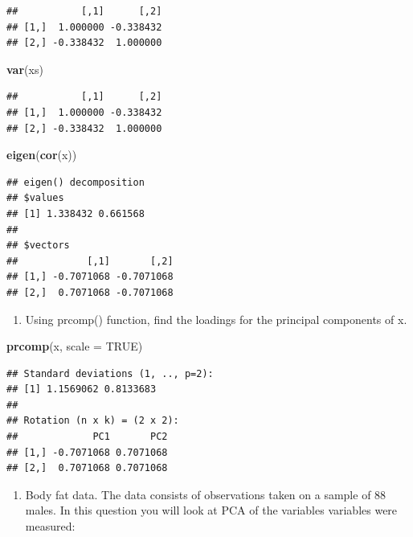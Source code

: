 \documentclass[]{article}
\newenvironment{Shaded}{\begin{snugshade}}{\end{snugshade}}
\newcommand{\DataTypeTok}[1]{\textcolor[rgb]{0.13,0.29,0.53}{#1}}
\newcommand{\KeywordTok}[1]{\textcolor[rgb]{0.13,0.29,0.53}{\textbf{#1}}}
\newcommand{\NormalTok}[1]{#1}
\newcommand{\OtherTok}[1]{\textcolor[rgb]{0.56,0.35,0.01}{#1}}
\providecommand{\tightlist}{%
  \setlength{\itemsep}{0pt}\setlength{\parskip}{0pt}}
\begin{document}
\begin{verbatim}
##           [,1]      [,2]
## [1,]  1.000000 -0.338432
## [2,] -0.338432  1.000000
\end{verbatim}

\begin{Shaded}
\begin{Highlighting}[]
\KeywordTok{var}\NormalTok{(xs)}
\end{Highlighting}
\end{Shaded}

\begin{verbatim}
##           [,1]      [,2]
## [1,]  1.000000 -0.338432
## [2,] -0.338432  1.000000
\end{verbatim}

\begin{Shaded}
\begin{Highlighting}[]
\KeywordTok{eigen}\NormalTok{(}\KeywordTok{cor}\NormalTok{(x))}
\end{Highlighting}
\end{Shaded}

\begin{verbatim}
## eigen() decomposition
## $values
## [1] 1.338432 0.661568
## 
## $vectors
##            [,1]       [,2]
## [1,] -0.7071068 -0.7071068
## [2,]  0.7071068 -0.7071068
\end{verbatim}

\begin{enumerate}
\def\labelenumi{(\alph{enumi})}
\setcounter{enumi}{4}
\tightlist
\item
  Using prcomp() function, find the loadings for the principal
  components of x.
\end{enumerate}

\begin{Shaded}
\begin{Highlighting}[]
\KeywordTok{prcomp}\NormalTok{(x, }\DataTypeTok{scale =} \OtherTok{TRUE}\NormalTok{)}
\end{Highlighting}
\end{Shaded}

\begin{verbatim}
## Standard deviations (1, .., p=2):
## [1] 1.1569062 0.8133683
## 
## Rotation (n x k) = (2 x 2):
##             PC1       PC2
## [1,] -0.7071068 0.7071068
## [2,]  0.7071068 0.7071068
\end{verbatim}

\begin{enumerate}
\def\labelenumi{\arabic{enumi}.}
\setcounter{enumi}{1}
\tightlist
\item
  Body fat data. The data consists of observations taken on a sample of
  88 males. In this question you will look at PCA of the variables
  variables were measured:
\end{enumerate}
\end{document}
